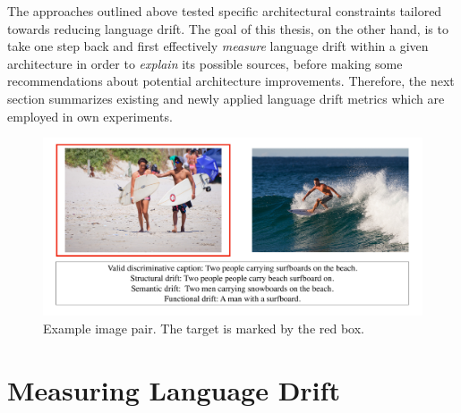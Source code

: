 The approaches outlined above tested specific architectural constraints tailored towards reducing language drift. The goal of this thesis, on the other hand, is to take one step back and first effectively \textit{measure} language drift within a given architecture in order to \textit{explain} its possible sources, before making some recommendations about potential architecture improvements. Therefore, the next section summarizes existing and newly applied language drift metrics which are employed in own experiments. 
 
\begin{figure}
	\centering
	\includegraphics[width=0.9\linewidth]{images/COCO_drift_example_cropped.pdf}
	\caption{Example image pair. The target is marked by the red box.}
	\label{fig:coco_drift_example}
\end{figure}


\section{Measuring Language Drift}
\label{ld_metrics}


